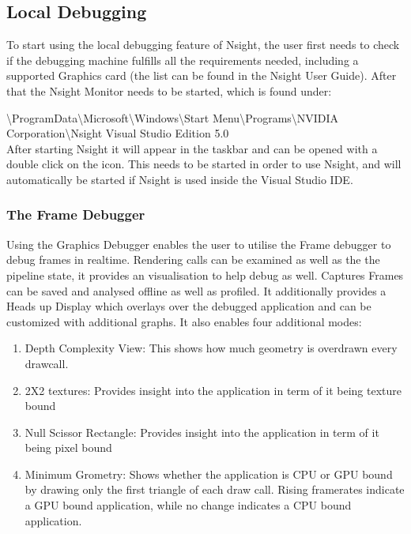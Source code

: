 \subsection {Local Debugging}

To start using the local debugging feature of Nsight, the user first needs to check if the debugging machine fulfills all the requirements needed, including a supported Graphics card (the list can be found in the Nsight User Guide). After that the Nsight Monitor needs to be started, which is found under:

\textbackslash ProgramData\textbackslash Microsoft\textbackslash Windows\textbackslash Start Menu\textbackslash Programs\textbackslash NVIDIA Corporation\textbackslash Nsight Visual Studio Edition 5.0\\

After starting Nsight it will appear in the taskbar and can be opened with a double click on the icon. This needs to be started in order to use Nsight, and will automatically be started if Nsight is used inside the Visual Studio IDE.\\

\subsubsection {The Frame Debugger}

Using the Graphics Debugger enables the user to utilise the Frame debugger to debug frames in realtime. Rendering calls can be examined as well as the the pipeline state, it provides an visualisation to help debug as well. Captures Frames can be saved and analysed offline as well as profiled.
It additionally provides a Heads up Display which overlays over the debugged application and can be customized with additional graphs. It also enables four additional modes:
\begin{enumerate}
\item Depth Complexity View: This shows how much geometry is overdrawn every drawcall.
\item 2X2 textures: Provides insight into the application in term of it being texture bound
\item Null Scissor Rectangle: Provides insight into the application in term of it being pixel bound 
\item Minimum Grometry: Shows whether the application is CPU or GPU bound by drawing only the first triangle of each draw call. Rising framerates indicate a GPU bound application, while no change indicates a CPU bound application.
\end{enumerate}


